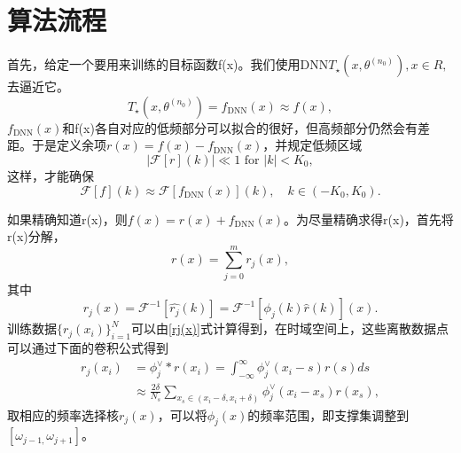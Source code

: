 \section{算法流程}
首先，给定一个要用来训练的目标函数f(x)。我们使用DNN$T_{\star}(x,\theta^{(n_{0}%
)}),x\in R,$去逼近它。
\begin{equation}
T_{\star}(x,\theta^{(n_{0})})=f_{\text{DNN}}(x)\approx f(x),\label{f1(x)}%
\end{equation}
$f_{\text{DNN}}(x)$和f(x)各自对应的低频部分可以拟合的很好，但高频部分仍然会有差距。于是定义余项$r(x)=f(x)-f_{\text{DNN}}(x)$，并规定低频区域
\begin{equation}
\left\vert \mathcal{F}[r](k)\right\vert \ll1\text{ for }\left\vert
k\right\vert <K_{0},
\end{equation}
这样，才能确保
\begin{equation}
\mathcal{F}[f](k)\approx\mathcal{F}[f_{\text{DNN}}(x)](k),\quad k\in
(-K_{0},K_{0}).\label{eq:1psdnn}%
\end{equation}

如果精确知道r(x)，则$f(x) = r(x) + f_{\text{DNN}}(x)$。为尽量精确求得r(x)，首先将r(x)分解，
\begin{equation}
r(x)=%
{\displaystyle\sum\limits_{j=0}^{m}}
r_{j}(x),
\end{equation}
其中
\begin{equation}
r_{j}(x)=\mathcal{F}^{-1}[\widehat{r_{j}}(k)]=\mathcal{F}^{-1}[\phi
_{j}(k)\widehat{r}(k)](x).\label{rj(x)}%
\end{equation}
训练数据$\{r_{j}(x_{i})\}_{i=1}^{N}$可以由\ref{rj(x)}式计算得到，在时域空间上，这些离散数据点可以通过下面的卷积公式得到
\begin{align}
r_{j}(x_{i}) &  =\phi_{j}^{\vee}\ast r(x_{i})=\int_{-\infty}^{\infty}\phi
_{j}^{\vee}(x_{i}-s)r(s)ds\nonumber\\
&  \approx\frac{2\delta}{N_{s}}%
{\displaystyle\sum\limits_{x_{s}\in(x_{i}-\delta,x_{i}+\delta)}}
\phi_{j}^{\vee}(x_{i}-x_{s})r(x_{s}),\label{convol}%
\end{align}
取相应的频率选择核$r_{j}(x)$，可以将$\phi_j(x)$的频率范围，即支撑集调整到$[\omega_{j-1,}\omega_{j+1}]$。


